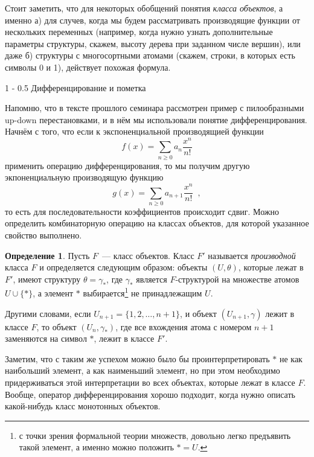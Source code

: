 \documentclass{article}
\makeatletter
\theoremstyle{definition}
\newtheorem*{definition}{Определение}
\renewcommand{\subsection}{\@startsection
{subsection}%
{1}%
{\z@}%
{-\baselineskip}%
{0.5\baselineskip}%
{\centering\large\scshape}} %
\makeatother
\begin{document}
Стоит заметить, что для некоторых обобщений понятия \textit{класса объектов}, а именно
а) для случев, когда мы будем рассматривать производящие функции от нескольких
переменных (например, когда нужно узнать дополнительные параметры структуры,
скажем, высоту дерева при заданном числе вершин), или даже б) структуры с
многосортными атомами
(скажем, строки, в которых есть символы 0 и 1), действует похожая формула.

\subsection{Дифференцирование и пометка}
 
Напомню, что в тексте прошлого семинара рассмотрен пример с пилообразными
up-down перестановками, и в нём мы использовали понятие дифференцирования.
Начнём с того, что если к экспоненциальной производящией функции
\[
    f(x) = \sum_{n \geq 0} a_n \dfrac{x^n}{n!}
\]
применить операцию дифференцирования, то мы получим другую экпоненциальную
производящую функцию
\[
    g(x) = \sum_{n \geq 0} a_{n+1} \dfrac{x^n}{n!} \enspace ,
\]
то есть для последовательности коэффициентов происходит сдвиг. Можно определить
комбинаторную операцию на классах объектов, для которой указанное свойство
выполнено.

\begin{definition}
    Пусть \( F \)~--- класс объектов. Класс \( F' \) называется
\textit{производной} класса \( F \) и определяется следующим образом: объекты
\( (U, \theta) \), которые лежат в \( F' \), имеют структуру
\(
    \theta = \gamma_{\ast}
\),
где \( \gamma_{\ast} \) является \( F \)-структурой на множестве атомов \( U
\cup \{\ast\} \), а элемент \( \ast \) выбирается\footnote{с точки зрения
формальной теории множеств, довольно легко предъявить такой элемент, а именно
можно положить \( \ast = U \).} не принадлежащим \( U \).

Другими словами, если
\( U_{n+1} = \{ 1, 2, \ldots, n+1 \} \), и объект \( (U_{n+1}, \gamma) \) лежит
в классе \( F \), то объект \( (U_n, \gamma_{\ast}) \), где все вхождения атома с
номером \( n+1 \) заменяются на символ \( \ast \), лежит в классе \( F' \).
\end{definition}

Заметим, что с таким же успехом можно было бы проинтерпретировать \( \ast \) не
как наибольший элемент, а как наименьший элемент, но при этом необходимо
придерживаться этой интерпретации во всех объектах, которые лежат в классе \( F
\). Вообще, оператор дифференцирования хорошо подходит, когда нужно описать
какой-нибудь класс монотонных объектов.
\end{document}
